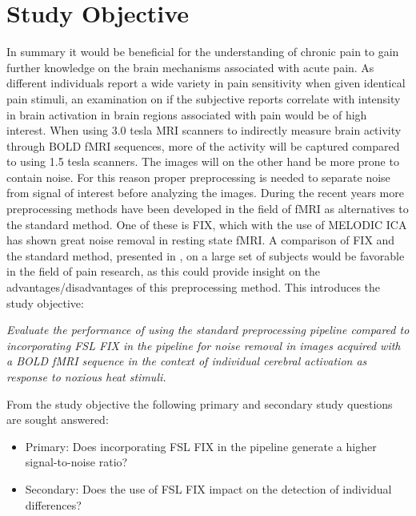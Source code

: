\chapter{Study Objective}

In summary it would be beneficial for the understanding of chronic pain to gain further knowledge on the brain mechanisms associated with acute pain. As different individuals report a wide variety in pain sensitivity when given identical pain stimuli, an examination on if the subjective reports correlate with intensity in brain activation in brain regions associated with pain would be of high interest. When using 3.0 tesla MRI scanners to indirectly measure brain activity through BOLD fMRI sequences, more of the activity will be captured compared to using 1.5 tesla scanners. The images will on the other hand be more prone to contain noise. For this reason proper preprocessing is needed to separate noise from signal of interest before analyzing the images. During the recent years more preprocessing methods have been developed in the field of fMRI as alternatives to the standard method. One of these is FIX, which with the use of MELODIC ICA has shown great noise removal in resting state fMRI. A comparison of FIX and the standard method, presented in , on a large set of subjects would be favorable in the field of pain research, as this could provide insight on the advantages/disadvantages of this preprocessing method. This introduces the study objective:

\begin{center}

\textit{Evaluate the performance of using the standard preprocessing pipeline compared to incorporating FSL FIX in the pipeline for noise removal in images acquired with a BOLD fMRI sequence in the context of individual cerebral activation as response to noxious heat stimuli.}

\end{center}

From the study objective the following primary and secondary study questions are sought answered: 

\begin{itemize}
	\item Primary: Does incorporating FSL FIX in the pipeline generate a higher signal-to-noise ratio?
	
	\item Secondary: Does the use of FSL FIX impact on the detection of individual differences?
	  
	 
\end{itemize}

